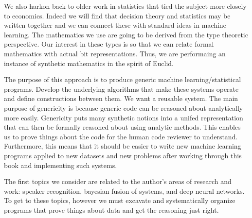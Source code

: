 We also harkon back to older work in statistics that tied the subject more closely to economics.
Indeed we will find that decision theory and statistics may be written together
and we can connect these with standard ideas in machine learning.  The mathematics we use
are going to be derived from the type theoretic perspective.  Our interest in these types is so that we can
relate formal mathematics with actual bit representations.  Thus, we are performaing an instance of
synthetic mathematics in the spirit of Euclid.

The purpose of this approach is to produce generic machine
learning/statistical programs.  Develop the underlying algorithms that
make these systems operate and define constructions between them.  We
want a reusable system.  The main purpose of genericity is because
generic code can be reasoned about analytically more easily.
Genericity puts many synthetic notions into a unifed representation
that can then be formally reasoned about using analytic methods.  This
enables us to prove things about the code for the human code reviewer
to understand.  Furthermore, this means that it should be easier to write
new machine learning programs applied to new datasets and new problems
after working through this book and implementing such systems.

The first topics we consider are related to the author's areas of
research and work: speaker recognition, bayesian fusion of systems,
and deep neural networks.  To get to these topics, however we must
excavate and systematically organize programs that prove things about
data and get the reasoning just right.
